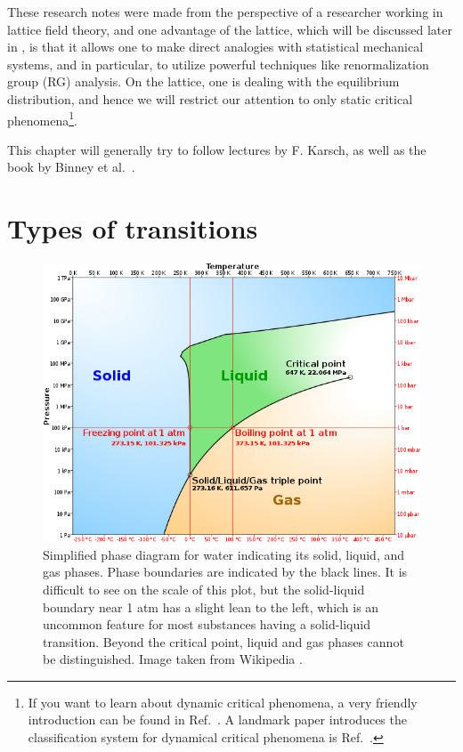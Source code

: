 These research notes were made from the perspective of a researcher working
in lattice field theory, and one advantage of the lattice, which will be
discussed later in , is that it allows one
to make direct analogies with statistical mechanical systems, and in
particular, to utilize powerful techniques like renormalization group (RG)
analysis. On the lattice, one is dealing with the equilibrium distribution,
and hence we will restrict our attention to only static critical 
phenomena\footnote{If you want to learn about dynamic critical phenomena, a very
friendly introduction can be found in Ref.~\cite{halperin_theory_2019}.
A landmark paper introduces the classification system for dynamical
critical phenomena is Ref.~\cite{hohenberg_theory_1977}.}.

This chapter will generally try to follow 
lectures by F. Karsch, as well as the book by Binney et
al.~\cite{binney_theory_1992}. 

\section{Types of transitions}\label{sec:typesOfTransitions}

\begin{figure}
\centering
\includegraphics[width=\linewidth]{figs/simplified_water.png}
\caption{Simplified phase diagram for water indicating its solid, liquid, and
gas phases. Phase boundaries are indicated by the black lines. It is difficult
to see on the scale of this plot, but the solid-liquid boundary near 1 atm has a
slight lean to the left, which is an uncommon feature for most substances having
a solid-liquid transition. Beyond the
critical point, liquid and gas phases cannot be distinguished. 
Image taken from Wikipedia \cite{Wiki_water}.}
\label{fig:phase_water}
\end{figure}


